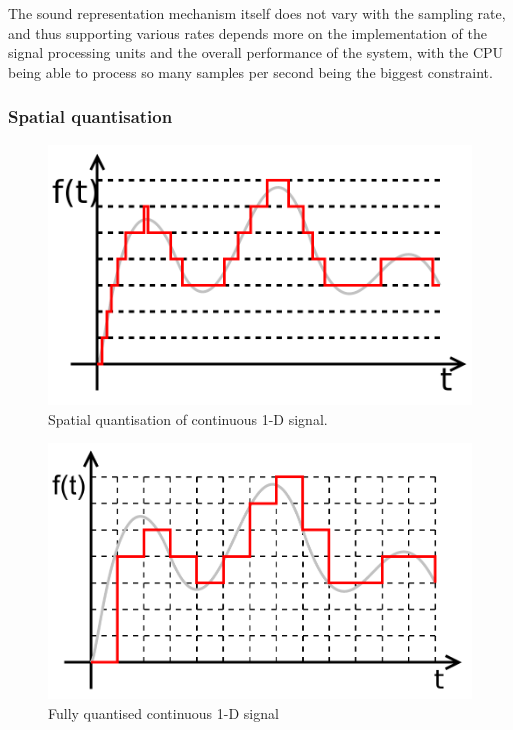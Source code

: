 The sound representation mechanism itself does not vary with the
sampling rate, and thus supporting various rates depends more on the
implementation of the signal processing units and the overall
performance of the system, with the CPU being able to process so many
samples per second being the biggest constraint.

\subsubsection{Spatial quantisation}

\begin{figure}[h!]
  \centering
  \includegraphics[width=.8\textwidth]{pic/sampled-2.pdf}
  \caption{Spatial quantisation of continuous 1-D signal.}
  \label{fig:sampled-2}  
\end{figure}

\begin{figure}[h!]
  \centering
  \includegraphics[width=.8\textwidth]{pic/sampled-3.pdf}
  \caption{Fully quantised continuous 1-D signal}
  \label{fig:sampled-3}
\end{figure}

